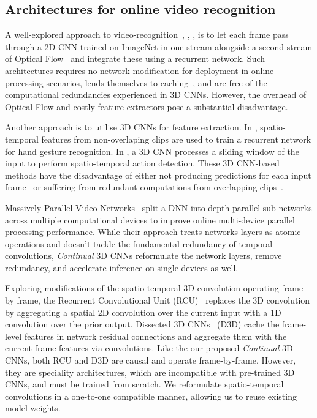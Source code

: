 \documentclass[runningheads]{llncs}
\begin{document}
\vspace{-3pt}
\subsection{Architectures for online video recognition}
\vspace{-3pt}

A well-explored approach to video-recognition~\cite{donahue2015longterm}, \cite{yuehei2015beyond}, \cite{kalogeiton2017action}, \cite{singh2017online} is to let each frame pass through a 2D CNN trained on ImageNet in one stream alongside a second stream of Optical Flow~\cite{farneback2003twoframe} and integrate these using a recurrent network. Such architectures requires no network modification for deployment in online-processing scenarios, lends themselves to caching~\cite{xu2018deepcache}, and are free of the computational redundancies experienced in 3D CNNs.
However, the overhead of Optical Flow and costly feature-extractors pose a substantial disadvantage.


Another approach is to utilise 3D CNNs for feature extraction. 
In \cite{molchanov2016online}, spatio-temporal features from non-overlaping clips are used to train a recurrent network for hand gesture recognition.
In \cite{kopuklu2019yowo}, a 3D CNN processes a sliding window of the input to perform spatio-temporal action detection.
These 3D CNN-based methods have the disadvantage of either not producing predictions for each input frame~\cite{molchanov2016online} or suffering from redundant computations from overlapping clips~\cite{kopuklu2019yowo}.

Massively Parallel Video Networks~\cite{carreira2018massively} split a DNN into depth-parallel sub-networks across multiple computational devices to improve online multi-device parallel processing performance. While their approach treats networks layers as atomic operations and doesn't tackle the fundamental redundancy of temporal convolutions, \textit{Continual} 3D CNNs reformulate the network layers, remove redundancy, and accelerate inference on single devices as well.

Exploring modifications of the spatio-temporal 3D convolution operating frame by frame, the Recurrent Convolutional Unit (RCU)~\cite{singh2019recurrent} replaces the 3D convolution by aggregating a spatial 2D convolution over the current input with a 1D convolution over the prior output. 
Dissected 3D CNNs~\cite{kopuklu2020dissected} (D3D) cache the  frame-level features in network residual connections and aggregate them with the current frame features via  convolutions.
Like the our proposed \textit{Continual} 3D CNNs, both RCU and D3D are causal and operate frame-by-frame.
However, they are speciality architectures, which are incompatible with pre-trained 3D CNNs, and must be trained from scratch.
We reformulate spatio-temporal convolutions in a one-to-one compatible manner, allowing us to reuse existing model weights. 
\end{document}
